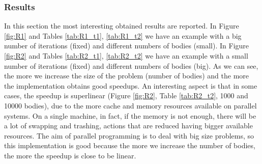 \documentclass[a4paper]{article}
\begin{document}
\subsubsection{Results}
\label{sec:res}
In this section the most interesting obtained results are reported. In Figure \ref{fig:R1} and Tables \ref{tab:R1_t1}, \ref{tab:R1_t2} we have an example with a big number of iterations (fixed) and different numbers of bodies (small). In Figure \ref{fig:R2} and Tables \ref{tab:R2_t1}, \ref{tab:R2_t2} we have an example with a small number of iterations (fixed) and different numbers of bodies (big). As we can see, the more we increase the size of the problem (number of bodies) and the more the implementation obtains good speedups. An interesting aspect is that in some cases, the speedup is superlinear (Figure \ref{fig:R2}, Table \ref{tab:R2_t2}, 1000 and 10000 bodies), due to the more cache and memory resources available on parallel systems. On a single machine, in fact, if the memory is not enough, there will be a lot of swapping and trashing, actions that are reduced having bigger available resources.
The aim of parallel programming is to deal with big size problems, so this implementation is good because the more we increase the number of bodies, the more the speedup is close to be linear. \\
\end{document}

